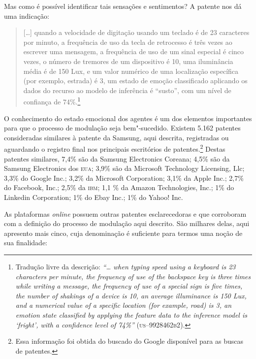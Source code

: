 Mas como é possível identificar tais sensações e sentimentos? A patente
nos dá uma indicação:

\begin{quote}
{[}\ldots{}{]} quando a velocidade de digitação usando um teclado é de 23
caracteres por minuto, a frequência de uso da tecla de retrocesso é três
vezes ao escrever uma mensagem, a frequência de uso de um sinal especial
é cinco vezes, o número de tremores de um dispositivo é 10, uma
iluminância média é de 150 Lux, e um valor numérico de uma localização
específica (por exemplo, estrada) é 3, um estado de emoção classificado
aplicando os dados do recurso ao modelo de inferência é ``susto'', com
um nível de confiança de 74\%.\footnote{Tradução livre da descrição:
  \emph{``\ldots{} when typing speed using a keyboard is 23 characters per
    minute, the frequency of use of the backspace key is three times while
    writing a message, the frequency of use of a special sign is five
    times, the number of shakings of a device is 10, an average
    illuminance is 150 Lux, and a numerical value of a specific location
    (for example, road) is 3, an emotion state classified by applying the
    feature data to the inference model is `fright', with a confidence
    level of 74\%''} (\textsc{us--9928462b2}).} 
\end{quote}

O conhecimento do estado emocional dos agentes é um dos elementos
importantes para que o processo de modulação seja bem"-sucedido. Existem
5.162 patentes consideradas similares à patente da Samsung, aqui
descrita, registradas ou aguardando o registro final nos principais
escritórios de patentes.\footnote{Essa informação foi obtida do buscado
  do Google disponível para as buscas de patentes.} Destas patentes
similares, 7,4\% são da Samsung Electronics Coreana; 4,5\% são da
Samsung Electronics dos \textsc{eua}; 3,9\% são da Microsoft Technology
Licensing, Llc; 3,3\% do Google Inc.; 3,2\% da Microsoft Corporation;
3,1\% da Apple Inc.; 2,7\% do Facebook, Inc.; 2,5\% da \textsc{ibm}; 1,1 \% da
Amazon Technologies, Inc.; 1\% do Linkedin Corporation; 1\% do Ebay
Inc.; 1\% do Yahoo! Inc.

As plataformas \emph{online} possuem outras patentes esclarecedoras e que
corroboram com a definição do processo de modulação aqui descrito. São
milhares delas, aqui apresento mais cinco, cuja denominação é suficiente
para termos uma noção de sua finalidade:

